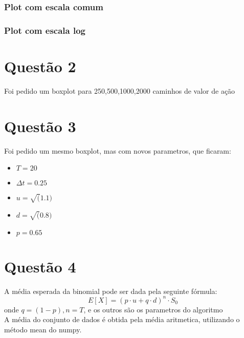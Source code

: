 \documentclass[
	11pt,				%
	openright,			%
	oneside,			%
	a4paper,			%
	english,			%
	french,				%
	spanish,			%
	brazil,				%
	]{abntex2}
\begin{document}
\subsection{Plot com escala comum}
  \begin{figure}[h]
    \hspace*{-2cm}
  \end{figure}
\subsection{Plot com escala log}
\begin{figure}[h]
  \hspace*{-2cm}
\end{figure}

\chapter{Questão 2}
Foi pedido um boxplot para 250,500,1000,2000 caminhos de valor de ação
\begin{figure}[h]
\end{figure}

\chapter{Questão 3}
Foi pedido um mesmo boxplot, mas com novos parametros, que ficaram:
\begin{itemize}
  \item $T = 20$
  \item $\Delta t = 0.25$
  \item $u = \sqrt(1.1)$
  \item $d = \sqrt(0.8)$
  \item $p = 0.65$
\end{itemize}
\begin{figure}[h]
\end{figure}

\chapter{Questão 4}
A média esperada da binomial pode ser dada pela seguinte fórmula:
$$E[X] = (p\cdot u + q\cdot d)^n \cdot S_0$$
onde $q = (1-p), n = T$, e os outros são os parametros do algoritmo\\
A média do conjunto de dados é obtida pela média aritmetica, utilizando o método {\color{red} mean} do numpy.
\end{document}
